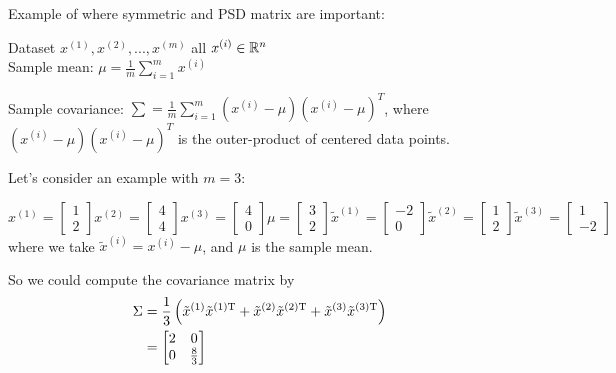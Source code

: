 \vspace{0.3cm}
Example of where symmetric and PSD matrix are important:

Dataset $x^{(1)}, x^{(2)}, ..., x^{(m)}$ all $x^{(i)}\in \mathbb{R}^n$\\

Sample mean: $\mu = \frac{1}{m}\sum^m_{i=1}x^{(i)}$

Sample covariance: $\sum = \frac{1}{m}\sum^m_{i=1}(x^{(i)}-\mu)(x^{(i)}-\mu)^T$, where $(x^{(i)}-\mu)(x^{(i)}-\mu)^T$ is the outer-product of centered data points.

\vspace{0.3cm}
Let's consider an example with $m=3$:

$$x^{(1)} =
\left[
\begin{matrix}
1\\
2
\end{matrix}
\right]x^{(2)} =
\left[
\begin{matrix}
4\\
4
\end{matrix}
\right]x^{(3)} =
\left[
\begin{matrix}
4\\
0
\end{matrix}
\right]\mu =
\left[
\begin{matrix}
3\\
2
\end{matrix}
\right]\tilde{x}^{(1)} =
\left[
\begin{matrix}
-2\\
0
\end{matrix}
\right]\tilde{x}^{(2)} =
\left[
\begin{matrix}
1\\
2
\end{matrix}
\right]\tilde{x}^{(3)} =
\left[
\begin{matrix}
1\\
-2
\end{matrix}
\right]
$$
where we take $\tilde{x}^{(i)}=x^{(i)}-\mu$, and $\mu$ is the sample mean.

So we could compute the covariance matrix by
\begin{align*}
\Sigma &= \frac{1}{3} \left(\tilde{x}^{(1)}\tilde{x}^{(1){\rm T}}+\tilde{x}^{(2)}\tilde{x}^{(2){\rm T}}    +\tilde{x}^{(3)}\tilde{x}^{(3){\rm T}}\right)\\
&= \left[
\begin{matrix}
2&0\\
0&\frac{8}{3}
\end{matrix}
\right]
\end{align*}

